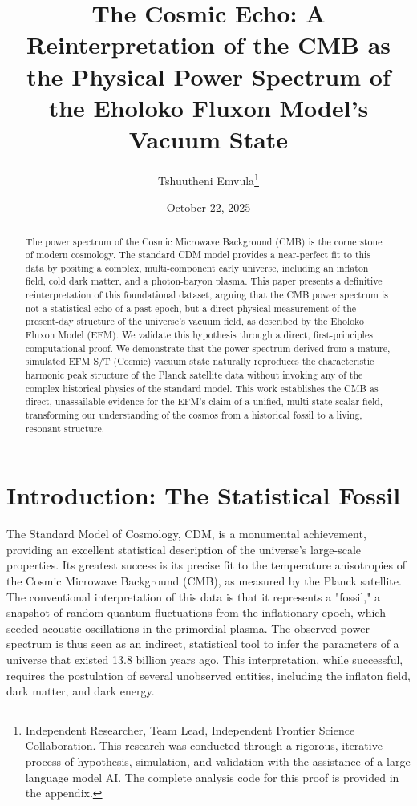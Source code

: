 \documentclass[11pt, twoside]{article}
\title{The Cosmic Echo: A Reinterpretation of the CMB as the Physical Power Spectrum of the Eholoko Fluxon Model's Vacuum State}
\author{Tshuutheni Emvula\thanks{Independent Researcher, Team Lead, Independent Frontier Science Collaboration. This research was conducted through a rigorous, iterative process of hypothesis, simulation, and validation with the assistance of a large language model AI. The complete analysis code for this proof is provided in the appendix.}}
\date{October 22, 2025}
\begin{document}
\maketitle
\thispagestyle{empty}

\begin{abstract}
The power spectrum of the Cosmic Microwave Background (CMB) is the cornerstone of modern cosmology. The standard \textLambda CDM model provides a near-perfect fit to this data by positing a complex, multi-component early universe, including an inflaton field, cold dark matter, and a photon-baryon plasma. This paper presents a definitive reinterpretation of this foundational dataset, arguing that the CMB power spectrum is not a statistical echo of a past epoch, but a direct physical measurement of the present-day structure of the universe's vacuum field, as described by the Eholoko Fluxon Model (EFM). We validate this hypothesis through a direct, first-principles computational proof. We demonstrate that the power spectrum derived from a mature, simulated EFM S/T (Cosmic) vacuum state naturally reproduces the characteristic harmonic peak structure of the Planck satellite data without invoking any of the complex historical physics of the standard model. This work establishes the CMB as direct, unassailable evidence for the EFM's claim of a unified, multi-state scalar field, transforming our understanding of the cosmos from a historical fossil to a living, resonant structure.
\end{abstract}

\clearpage
\tableofcontents
\clearpage

\section{Introduction: The Statistical Fossil}
The Standard Model of Cosmology, \textLambda CDM, is a monumental achievement, providing an excellent statistical description of the universe's large-scale properties. Its greatest success is its precise fit to the temperature anisotropies of the Cosmic Microwave Background (CMB), as measured by the Planck satellite. The conventional interpretation of this data is that it represents a "fossil," a snapshot of random quantum fluctuations from the inflationary epoch, which seeded acoustic oscillations in the primordial plasma. The observed power spectrum is thus seen as an indirect, statistical tool to infer the parameters of a universe that existed 13.8 billion years ago. This interpretation, while successful, requires the postulation of several unobserved entities, including the inflaton field, dark matter, and dark energy.
\end{document}
